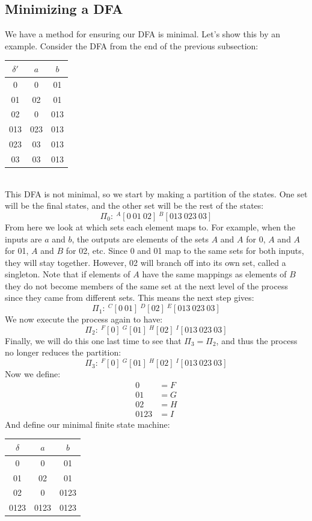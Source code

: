 \documentclass{scrartcl}
\begin{document}
\subsection{Minimizing a DFA}
We have a method for ensuring our DFA is minimal. Let's show this by an example. Consider the DFA from the end of the previous subsection:\\
\begin{center}
\begin{tabular} {|c|c c|}
\hline
$\delta'$&$a$&$b$\\
\hline
0& 0 & 01\\
01& 02 & 01\\
02& 0 & 013 \\
013& 023 & 013\\
023 & 03 & 013\\
03 & 03 & 013\\
\hline
\end{tabular}
\end{center}\ \\
This DFA is not minimal, so we start by making a partition of the states. One set will be the final states, and the other set will be the rest of the states:
$$\Pi_0:\ ^A[0\ 01\ 02]\ ^B[013\ 023\ 03]$$
From here we look at which sets each element maps to. For example, when the inputs are $a$ and $b$, the outputs are elements of the sets $A$ and $A$ for 0, $A$ and $A$ for 01, $A$ and $B$ for 02, etc. Since 0 and 01 map to the same sets for both inputs, they will stay together. However, 02 will branch off into its own set, called a singleton. Note that if elements of $A$ have the same mappings as elements of $B$ they do not become members of the same set at the next level of the process since they came from different sets. This means the next step gives:
$$\Pi_1:\ ^C[0\ 01]\ ^D[02]\ ^E[013\ 023\ 03]$$
We now execute the process again to have:
$$\Pi_2:\ ^F[0]\ ^G[01]\ ^H[02]\ ^I[013\ 023\ 03]$$
Finally, we will do this one last time to see that $\Pi_3=\Pi_2$, and thus the process no longer reduces the partition:
$$\Pi_3:\ ^F[0]\ ^G[01]\ ^H[02]\ ^I[013\ 023\ 03]$$
Now we define:
\begin{align*}
0&=F\\
01&=G\\
02&=H\\
0123&=I
\end{align*}
And define our minimal finite state machine:
\begin{center}
\begin{tabular} {|c|c c|}
\hline
$\delta$&$a$&$b$\\
\hline
0& 0 & 01\\
01& 02 & 01\\
02& 0 & 0123 \\
0123& 0123 & 0123\\
\hline
\end{tabular}
\end{center}\ \\
\end{document}
